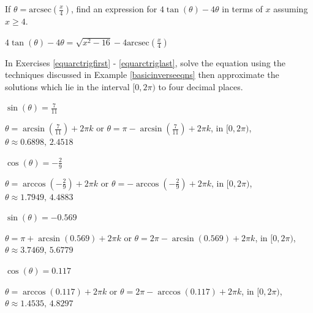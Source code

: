 \documentclass{ximera}
\begin{document}
\begin{problem}
If $\theta = \mbox{arcsec}\left(\frac{x}{4}\right)$,  find an expression for $4\tan(\theta) - 4\theta$ in terms of $x$ assuming $x \geq 4$.

\begin{solution}
$4\tan(\theta) - 4\theta = \sqrt{x^{2} - 16} - 4\mbox{arcsec} \left( \frac{x}{4} \right)$
\end{solution}
\end{problem}


\begin{question}
In Exercises \ref{equarctrigfirst} - \ref{equarctriglast}, solve the equation using the techniques discussed in Example \ref{basicinverseeqns} then approximate the solutions which lie in the interval $[0, 2\pi)$ to four decimal places.

\begin{problem} \label{equarctrigfirst}
$\sin(\theta) = \frac{7}{11}$ 

\begin{solution}
$\theta = \arcsin\left(\frac{7}{11}\right) + 2\pi k$ or $\theta = \pi - \arcsin\left(\frac{7}{11}\right) + 2\pi k$, in  $[0, 2\pi)$, $\theta \approx 0.6898, \, 2.4518$
\end{solution}
\end{problem}

\begin{problem}
$\cos(\theta) = -\frac{2}{9}$

\begin{solution}
$\theta = \arccos\left(-\frac{2}{9}\right) + 2\pi k$ or $\theta = - \arccos\left(-\frac{2}{9}\right) + 2\pi k$, in  $[0, 2\pi)$, $\theta \approx 1.7949, \, 4.4883$
\end{solution}
\end{problem}

\begin{problem}
$\sin(\theta) = -0.569$

\begin{solution}
$\theta = \pi + \arcsin(0.569) + 2\pi k$ or $\theta = 2\pi - \arcsin(0.569) + 2\pi k$, in  $[0, 2\pi)$, $\theta \approx 3.7469, \, 5.6779$
\end{solution}
\end{problem}

\begin{problem}
$\cos(\theta) = 0.117$

\begin{solution}
$\theta= \arccos(0.117) + 2\pi k$ or $\theta = 2\pi - \arccos(0.117) + 2\pi k$, in  $[0, 2\pi)$, $\theta \approx 1.4535, \, 4.8297$
\end{solution}
\end{problem}


\end{question}
\end{document}
